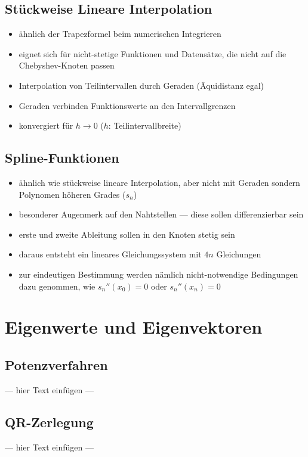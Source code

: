 \documentclass[a4paper, 12pt]{article}
\begin{document}
\subsection{Stückweise Lineare Interpolation}
\begin{itemize}
  \item ähnlich der Trapezformel beim numerischen Integrieren
  \item eignet sich für nicht-stetige Funktionen und Datensätze, die nicht auf die Chebyshev-Knoten passen
  \item Interpolation von Teilintervallen durch Geraden (Äquidistanz egal)
  \item Geraden verbinden Funktionswerte an den Intervallgrenzen
  \item konvergiert für \(h\rightarrow 0\) (\(h\): Teilintervallbreite)
\end{itemize}


\subsection{Spline-Funktionen}
\begin{itemize}
  \item ähnlich wie stückweise lineare Interpolation, aber nicht mit Geraden sondern Polynomen höheren Grades (\(s_n\))
  \item besonderer Augenmerk auf den Nahtstellen --- diese sollen differenzierbar sein
  \item erste und zweite Ableitung sollen in den Knoten stetig sein
  \item daraus entsteht ein lineares Gleichungssystem mit \(4n\) Gleichungen
  \item zur eindeutigen Bestimmung werden nämlich nicht-notwendige Bedingungen dazu genommen, wie \(s_n''(x_0)=0\) oder \(s_n''(x_n)=0\)
\end{itemize}



\section{Eigenwerte und Eigenvektoren}


\subsection{Potenzverfahren}
--- hier Text einfügen ---


\subsection{QR-Zerlegung}
--- hier Text einfügen ---
\end{document}
